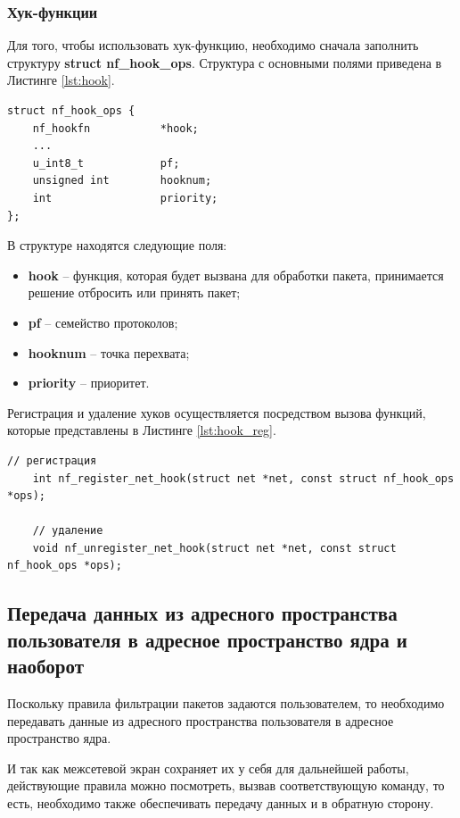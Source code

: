 \subsubsection{Хук-функции}
Для того, чтобы использовать хук-функцию, необходимо сначала заполнить структуру \textbf{struct nf\_hook\_ops}. Структура с основными полями приведена в Листинге \ref{lst:hook}.

\begin{lstlisting}[caption = {struct nf\_hook\_ops}, label=lst:hook]
struct nf_hook_ops {
	nf_hookfn			*hook;
	...
	u_int8_t			pf;
	unsigned int		hooknum;
	int					priority;
};
\end{lstlisting}

В структуре находятся следующие поля:
\begin{itemize}
	\item \textbf{hook} -- функция, которая будет вызвана для обработки пакета, принимается решение отбросить или принять пакет;
	
	\item \textbf{pf} -- семейство протоколов;
	
	\item \textbf{hooknum} -- точка перехвата;
	
	\item \textbf{priority} -- приоритет. \\
\end{itemize}

Регистрация и удаление хуков осуществляется посредством вызова функций, которые представлены в Листинге \ref{lst:hook_reg}.

\begin{lstlisting}[caption = {Функции для регистрации и удаления хук-функций}, label=lst:hook_reg]
	// регистрация
	int nf_register_net_hook(struct net *net, const struct nf_hook_ops *ops);
	
	// удаление
	void nf_unregister_net_hook(struct net *net, const struct nf_hook_ops *ops);
\end{lstlisting}


\subsection{Передача данных из адресного пространства пользователя в адресное пространство ядра и наоборот}
Поскольку правила фильтрации пакетов задаются пользователем, то необходимо передавать данные из адресного пространства пользователя в адресное пространство ядра. 

И так как межсетевой экран сохраняет их у себя для дальнейшей работы, действующие правила можно посмотреть, вызвав соответствующую команду, то есть, необходимо также обеспечивать передачу данных и в обратную сторону. 

